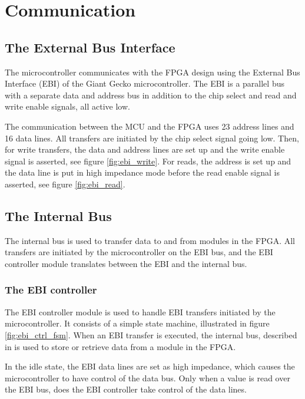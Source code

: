 \FloatBarrier
\section{Communication}

\subsection{The External Bus Interface}
The microcontroller communicates with the FPGA design using the External Bus
Interface (EBI) of the Giant Gecko microcontroller. The EBI is a parallel bus
with a separate data and address bus in addition to the chip select and read and
write enable signals, all active low\cite{efm_ebi}.

The communication between the MCU and the FPGA uses 23 address lines and 16
data lines. All transfers are initiated by the chip select signal going low.
Then, for write transfers, the data and address lines are set up and the
write enable signal is asserted, see figure \ref{fig:ebi_write}. For reads,
the address is set up and the data line is put in high impedance mode before
the read enable signal is asserted, see figure \ref{fig:ebi_read}.




\FloatBarrier
\subsection{The Internal Bus}

The internal bus is used to transfer data to and from modules in the FPGA.
All transfers are initiated by the microcontroller on the EBI bus, and the
EBI controller module translates between the EBI and the internal bus.

\subsubsection{The EBI controller}
The EBI controller module is used to handle EBI transfers initiated by the
microcontroller. It consists of a simple state machine, illustrated in
figure \ref{fig:ebi_ctrl_fsm}. When an EBI transfer is executed, the
internal bus, described in is used to store or retrieve data from a module
in the FPGA.

In the idle state, the EBI data lines are set as high impedance, which
causes the microcontroller to have control of the data bus. Only when
a value is read over the EBI bus, does the EBI controller take control of
the data lines.

